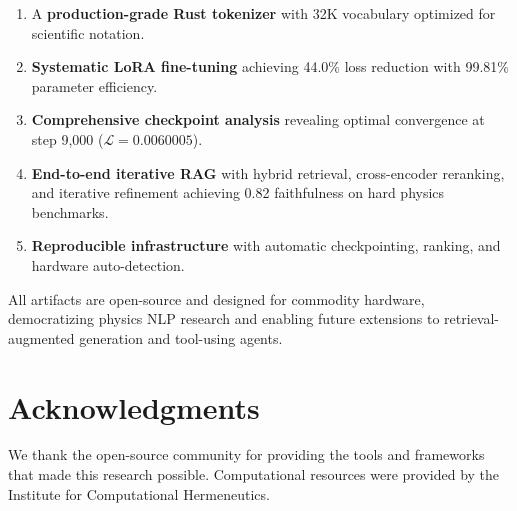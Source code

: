 \documentclass[11pt,a4paper]{article}
\theoremstyle{plain}
\theoremstyle{definition}
\newcommand{\loss}{\mathcal{L}}
\begin{document}
\begin{enumerate}[leftmargin=*,itemsep=2pt]
    \item A \textbf{production-grade Rust tokenizer} with 32K vocabulary
    optimized for scientific notation.
    
    \item \textbf{Systematic LoRA fine-tuning} achieving 44.0\% loss
    reduction with 99.81\% parameter efficiency.
    
    \item \textbf{Comprehensive checkpoint analysis} revealing optimal
    convergence at step 9,000 ($\loss = 0.0060005$).
    
    \item \textbf{End-to-end iterative RAG} with hybrid retrieval,
    cross-encoder reranking, and iterative refinement achieving 0.82
    faithfulness on hard physics benchmarks.
    
    \item \textbf{Reproducible infrastructure} with automatic
    checkpointing, ranking, and hardware auto-detection.
\end{enumerate}

All artifacts are open-source and designed for commodity hardware,
democratizing physics NLP research and enabling future extensions
to retrieval-augmented generation and tool-using agents.

\section*{Acknowledgments}
We thank the open-source community for providing the tools and
frameworks that made this research possible. Computational
resources were provided by the Institute for Computational
Hermeneutics.
\end{document}

